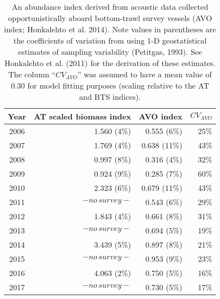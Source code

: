 \documentclass[]{article}
\begin{document}
\begin{table}[ht]
\centering
\caption{ 
An abundance index derived from acoustic data collected opportunistically
aboard bottom-trawl survey vessels (AVO index; Honkalehto et al. 2014). Note
values in parentheses are the coefficients of variation from using 1-D
geostatistical estimates of sampling variability (Petitgas, 1993). See
Honkalehto et al. (2011) for the derivation of these estimates. The column ``$CV_{AVO}$'' was
assumed to have a mean value of 0.30 for model fitting purposes (scaling
relative to the AT and BTS indices).
}
\label{tab:avo}
\begin{tabular}{crrr}
\hline
Year    & AT scaled biomass index & AVO index &   $CV_{AVO}$  \\
\hline 
2006    &   1.560  (4\%) &   0.555  (6\%)     &   25\% \\
2007    &   1.769  (4\%) &   0.638  (11\%)    &   43\% \\
2008    &   0.997  (8\%) &   0.316  (4\%)     &   32\% \\
2009    &   0.924  (9\%) &   0.285  (7\%)     &   60\% \\
2010    &   2.323  (6\%) &   0.679  (11\%)    &   43\% \\
2011    &   $-no\, survey-$   &   0.543  (6\%)      &   29\% \\
2012    &   1.843  (4\%) &   0.661  (8\%)     &   31\% \\
2013    &   $-no\, survey-$   &   0.694  (5\%)      &   19\% \\
2014    &   3.439  (5\%) &   0.897  (8\%)     &   21\% \\
2015    &   $-no\, survey-$   &   0.953  (9\%)      &   23\% \\
2016    &   4.063  (2\%) &   0.750  (5\%)     &   16\% \\
2017    &   $-no\, survey-$   &   0.730  (5\%)      &   17\% \\
\hline
\end{tabular}
\end{table}
\end{document}
